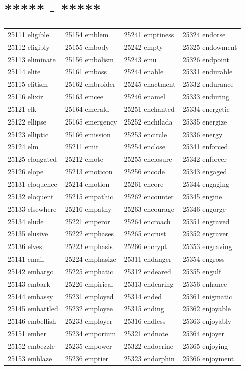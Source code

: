 \documentclass[10pt, oneside]{book}
\begin{document}
\begin{table}
	\centering
	\section*{***** - *****}
	\begin{tabular}{l l l l}
25111 eligible &25154 emblem &25241 emptiness &25324 endorse\\
25112 eligibly &25155 embody &25242 empty &25325 endowment\\
25113 eliminate &25156 embolism &25243 emu &25326 endpoint\\
25114 elite &25161 emboss &25244 enable &25331 endurable\\
25115 elitism &25162 embroider &25245 enactment &25332 endurance\\
25116 elixir &25163 emcee &25246 enamel &25333 enduring\\
25121 elk &25164 emerald &25251 enchanted &25334 energetic\\
25122 ellipse &25165 emergency &25252 enchilada &25335 energize\\
25123 elliptic &25166 emission &25253 encircle &25336 energy\\
25124 elm &25211 emit &25254 enclose &25341 enforced\\
25125 elongated &25212 emote &25255 enclosure &25342 enforcer\\
25126 elope &25213 emoticon &25256 encode &25343 engaged\\
25131 eloquence &25214 emotion &25261 encore &25344 engaging\\
25132 eloquent &25215 empathic &25262 encounter &25345 engine\\
25133 elsewhere &25216 empathy &25263 encourage &25346 engorge\\
25134 elude &25221 emperor &25264 encroach &25351 engraved\\
25135 elusive &25222 emphases &25265 encrust &25352 engraver\\
25136 elves &25223 emphasis &25266 encrypt &25353 engraving\\
25141 email &25224 emphasize &25311 endanger &25354 engross\\
25142 embargo &25225 emphatic &25312 endeared &25355 engulf\\
25143 embark &25226 empirical &25313 endearing &25356 enhance\\
25144 embassy &25231 employed &25314 ended &25361 enigmatic\\
25145 embattled &25232 employee &25315 ending &25362 enjoyable\\
25146 embellish &25233 employer &25316 endless &25363 enjoyably\\
25151 ember &25234 emporium &25321 endnote &25364 enjoyer\\
25152 embezzle &25235 empower &25322 endocrine &25365 enjoying\\
25153 emblaze &25236 emptier &25323 endorphin &25366 enjoyment\\
	\end{tabular}
 \end{table}
\end{document}
